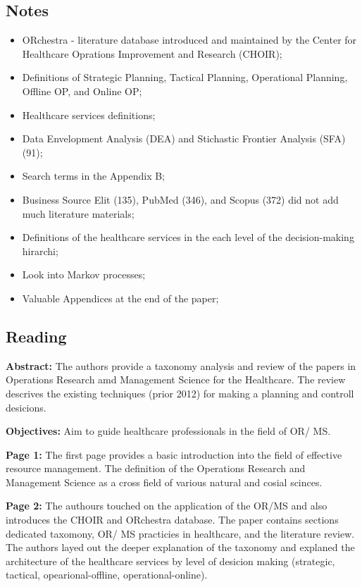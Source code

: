 \subsection{Notes}
    \begin{itemize}
        \item ORchestra - literature database introduced and maintained by the Center for Healthcare Oprations Improvement and Research (CHOIR);
        \item Definitions of Strategic Planning, Tactical Planning, Operational Planning, Offline OP, and Online OP;
        \item Healthcare services definitions;
        \item Data Envelopment Analysis (DEA) and Stichastic Frontier Analysis (SFA) (91);
        \item Search terms in the Appendix B;
        \item Business Source Elit (135), PubMed (346), and Scopus (372) did not add much literature materials;
        \item Definitions of the healthcare services in the each level of the decision-making hirarchi;
        \item Look into Markov processes;
        \item Valuable Appendices at the end of the paper; 
    \end{itemize}


\subsection{Reading}
    \textbf{Abstract:}
    The authors provide a taxonomy analysis and review of the papers in Operations Research amd Management Science for the Healthcare. The review descrives the existing techniques (prior 2012) for making a planning and controll desicions.
    
    \textbf{Objectives:}
    Aim to guide healthcare professionals in the field of OR/ MS.

    
    \textbf{Page 1:}
    The first page provides a basic introduction into the field of effective resource management. The definition of the Operations Research and Management Science as a cross field of various natural and cosial scinces. 
    
    \textbf{Page 2:}
    The authours touched on the application of the OR/MS and also introduces the CHOIR and ORchestra database. The paper contains sections dedicated taxomony, OR/ MS practicies in healthcare, and the literature review. The authors layed out the deeper explanation of the taxonomy and explaned the architecture of the healthcare services by level of desicion making (strategic, tactical, opearional-offline, operational-online).
    
